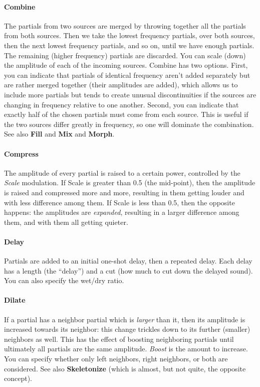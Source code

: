 \documentclass{article}
\begin{document}
\paragraph{Combine} The partials from two sources are merged by throwing together all the partials from both sources.  Then we take the lowest frequency partials, over both sources, then the next lowest frequency partials, and so on, until we have enough partials.  The remaining (higher frequency) partials are discarded.  You can scale (down) the amplitude of each of the incoming sources.  Combine has two options.  First, you can indicate that partials of identical frequency aren't added separately but are rather merged together (their amplitudes are added), which allows us to include more partials but tends to create unusual discontinuities if the sources are changing in frequency relative to one another.  Second, you can indicate that exactly half of the chosen partials must come from each source.  This is useful if the two sources differ greatly in frequency, so one will dominate the combination.  See also {\bf Fill} and {\bf Mix} and {\bf Morph}.

\paragraph{Compress}  The amplitude of every partial is raised to a certain power, controlled by the {\it Scale} modulation.  If Scale is greater than 0.5 (the mid-point), then the amplitude is raised and compressed more and more, resulting in them getting louder and with less difference among them.  If Scale is less than 0.5, then the opposite happens: the amplitudes are {\it expanded}, resulting in a larger difference among them, and with them all getting quieter.

\paragraph{Delay}  Partials are added to an initial one-shot delay, then a repeated delay.  Each delay has a length (the ``delay'') and a cut (how much to cut down the delayed sound).  You can also specify the wet/dry ratio.

\paragraph{Dilate} If a partial has a neighbor partial which is {\it larger} than it, then its amplitude is increased towards its neighbor: this change trickles down to its further (smaller) neighbors as well.  This has the effect of boosting neighboring partials until ultimately all partials are the same amplitude.  {\it Boost} is the amount to increase.  You can specify whether only left neighbors, right neighbors, or both are considered.  See also {\bf Skeletonize} (which is almost, but not quite, the opposite concept).
\end{document}
